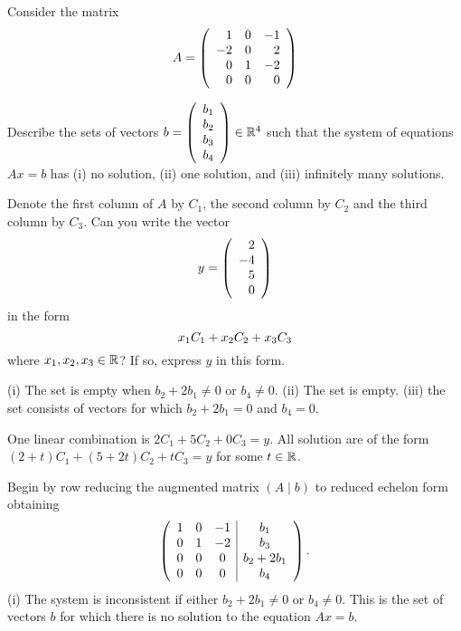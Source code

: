 \documentclass{ximera}
\author{Matthew Carr \& Martin Golubitsky}
\begin{document}
\begin{exercise}\label{mc.exerciseErr5}
Consider the matrix
\[
A=\left(\begin{array}{rrrrrrrrrrrrrrrrrr} 1 & 0 & -1 \\ -2 & 0 & 2 \\ 0 & 1 & -2 \\ 0 & 0 & 0 \end{array}\right)
\]
\begin{enumeratea}%
\item Describe the sets of vectors $b=\left(\begin{array}{rrrrrrrrrrrrrrrrrr} b_1\\b_2\\b_3\\b_4 \end{array}\right)\in\mathbb{R}^4$ such that the system of equations $Ax=b$ has (i) no solution, (ii) one solution, and (iii) infinitely many solutions.
\item Denote the first column of $A$ by $C_1$, the second column by $C_2$ and the third column by $C_3$.
Can you write the vector 
\[ 
y=\left(\begin{array}{rrrrrrrrrrrrrrrrrr} 2\\-4\\5 \\ 0 \end{array}\right)
\]
in the form 
\begin{equation} \label{e:linear_comb} \index{linear!combination}
x_1 C_1 + x_2 C_2 + x_3 C_3
\end{equation}
where $x_1, x_2, x_3 \in\mbox{$\mathbb{R}$}$?  If so, express $y$ in this form.
\end{enumeratea}


\begin{solution}

\ans \begin{enumeratea}%
\item (i) The set is empty when $b_2+2b_1\neq 0$ or $b_4\neq 0$. (ii) The set is empty.  (iii) the set consists of vectors for which $b_2+2b_1 = 0$ and $b_4 = 0$.
\item One linear combination is $2 C_1 + 5 C_2 + 0 C_3 = y$.  
All solution are of the form $(2+t) C_1 + (5+2t) C_2 + t C_3 = y$ for some $t\in\mbox{$\mathbb{R}$}$. 
\end{enumeratea}

\soln

\begin{enumeratea}%
\item Begin by row reducing the augmented matrix $\left(A\mid b\right)$ to reduced echelon form obtaining
\[
\left(\begin{array}{ccc|c} 
1 & 0 & -1 & b_1 \\ 
0 & 1 & -2 & b_3 \\ 
0 & 0 & 0 & b_2+2b_1 \\ 
0 & 0 & 0 & b_4
\end{array}\right)\ldotp
\]
(i) The system is inconsistent if either $b_2+2b_1\neq 0$ or $b_4 \neq 0$. This is the set of vectors $b$ for which there is no solution to the equation $Ax=b$.


\end{enumeratea}
\end{solution}
\end{exercise}
\end{document}

